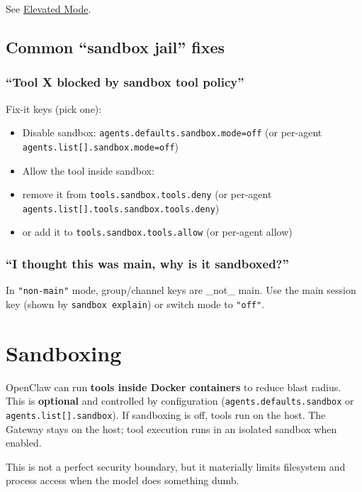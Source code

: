 See \href{/tools/elevated}{Elevated Mode}.

\subsection{Common “sandbox jail” fixes}


\subsubsection{“Tool X blocked by sandbox tool policy”}


Fix-it keys (pick one):

\begin{itemize}
  \item Disable sandbox: \texttt{agents.defaults.sandbox.mode=off} (or per-agent \texttt{agents.list[].sandbox.mode=off})
  \item Allow the tool inside sandbox:
  \item remove it from \texttt{tools.sandbox.tools.deny} (or per-agent \texttt{agents.list[].tools.sandbox.tools.deny})
  \item or add it to \texttt{tools.sandbox.tools.allow} (or per-agent allow)
\end{itemize}


\subsubsection{“I thought this was main, why is it sandboxed?”}


In \texttt{"non-main"} mode, group/channel keys are \_not\_ main. Use the main session key (shown by \texttt{sandbox explain}) or switch mode to \texttt{"off"}.


\clearpage

\section{Sandboxing}


OpenClaw can run \textbf{tools inside Docker containers} to reduce blast radius.
This is \textbf{optional} and controlled by configuration (\texttt{agents.defaults.sandbox} or
\texttt{agents.list[].sandbox}). If sandboxing is off, tools run on the host.
The Gateway stays on the host; tool execution runs in an isolated sandbox
when enabled.

This is not a perfect security boundary, but it materially limits filesystem
and process access when the model does something dumb.

